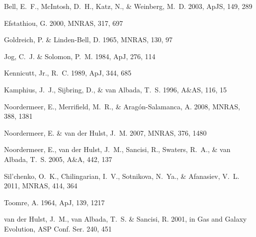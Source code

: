 \documentclass[russian,12pt]{article}
\begin{document}
\begin{thebibliography}{99}

   {Bell}, E.~F., {McIntosh}, D.~H., {Katz}, N., 
   \& {Weinberg}, M.~D. 2003, ApJS, 149, 289

   {Efstathiou}, G. 2000, MNRAS, 317, 697

    {Goldreich}, P. \& {Linden-Bell}, D. 1965, MNRAS, 130, 97

    {Jog}, C.~J. \& {Solomon}, P.~M. 1984, ApJ, 276, 114

   {Kennicutt}, Jr., R.~C. 1989, ApJ, 344, 685
   
   {Kamphius}, J.~J., {Sijbring}, D., \& {van Albada}, T.~S. 1996,
   A\&AS, 116, 15
   
   {Noordermeer}, E., {Merrifield}, M.~R., \& {Arag{\'o}n-Salamanca}, A. 2008,
   MNRAS, 388, 1381

   {Noordermeer}, E. \& {van der Hulst}, J.~M. 2007, MNRAS, 376, 1480

   {Noordermeer}, E., {van der Hulst}, J.~M., {Sancisi}, R., 
   {Swaters}, R.~A., \& {van Albada}, T.~S. 2005, A\&A, 442, 137

   {Sil'chenko}, O.~K., {Chilingarian}, I.~V., {Sotnikova}, N.~Ya., 
   \& {Afanasiev}, V.~L. 2011, MNRAS, 414, 364

   {Toomre}, A. 1964, ApJ, 139, 1217

   {van der Hulst}, J.~M., {van Albada}, T.~S. \& {Sancisi}, R. 2001,
   in Gas and Galaxy Evolution, ASP Conf. Ser. 240, 451
	       
\end{thebibliography}
\end{document}
